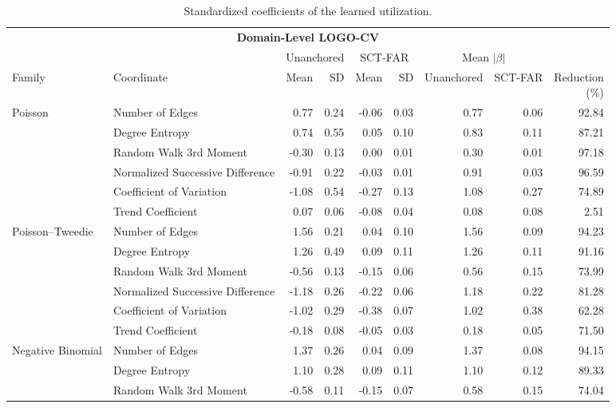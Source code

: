 \documentclass{article}
\begin{document}
\begin{table}[H]
\centering
\footnotesize
\captionsetup{position=top,skip=12pt}
\caption{Standardized coefficients of the learned utilization.}
\label{tab:si-coefficients}
\begin{tabularx}{\linewidth}{@{}l>{\raggedright\arraybackslash}Xrrrrrrr@{}}
\toprule
\multicolumn{9}{c}{\textbf{Domain-Level LOGO-CV}} \\
\cmidrule(lr){1-9}
 & & \multicolumn{2}{c}{Unanchored} & \multicolumn{2}{c}{SCT-FAR} & \multicolumn{2}{c}{Mean $\lvert \beta \rvert$} & \\
\cmidrule(lr){3-4}\cmidrule(lr){5-6}\cmidrule(lr){7-8}
Family & Coordinate & Mean & SD & Mean & SD & Unanchored & SCT-FAR & \shortstack{Reduction\\(\%)} \\
\midrule
Poisson & Number of Edges & 0.77 & 0.24 & -0.06 & 0.03 & 0.77 & 0.06 & 92.84 \\
 & Degree Entropy & 0.74 & 0.55 & 0.05 & 0.10 & 0.83 & 0.11 & 87.21 \\
 & Random Walk 3rd Moment & -0.30 & 0.13 & 0.00 & 0.01 & 0.30 & 0.01 & 97.18 \\
 & Normalized Successive Difference & -0.91 & 0.22 & -0.03 & 0.01 & 0.91 & 0.03 & 96.59 \\
 & Coefficient of Variation & -1.08 & 0.54 & -0.27 & 0.13 & 1.08 & 0.27 & 74.89 \\
 & Trend Coefficient & 0.07 & 0.06 & -0.08 & 0.04 & 0.08 & 0.08 & 2.51 \\
\addlinespace
Poisson--Tweedie & Number of Edges & 1.56 & 0.21 & 0.04 & 0.10 & 1.56 & 0.09 & 94.23 \\
 & Degree Entropy & 1.26 & 0.49 & 0.09 & 0.11 & 1.26 & 0.11 & 91.16 \\
 & Random Walk 3rd Moment & -0.56 & 0.13 & -0.15 & 0.06 & 0.56 & 0.15 & 73.99 \\
 & Normalized Successive Difference & -1.18 & 0.26 & -0.22 & 0.06 & 1.18 & 0.22 & 81.28 \\
 & Coefficient of Variation & -1.02 & 0.29 & -0.38 & 0.07 & 1.02 & 0.38 & 62.28 \\
 & Trend Coefficient & -0.18 & 0.08 & -0.05 & 0.03 & 0.18 & 0.05 & 71.50 \\
\addlinespace
Negative Binomial & Number of Edges & 1.37 & 0.26 & 0.04 & 0.09 & 1.37 & 0.08 & 94.15 \\
 & Degree Entropy & 1.10 & 0.28 & 0.09 & 0.11 & 1.10 & 0.12 & 89.33 \\
 & Random Walk 3rd Moment & -0.58 & 0.11 & -0.15 & 0.07 & 0.58 & 0.15 & 74.04 \\

\end{tabularx}
\end{table}
\end{document}
